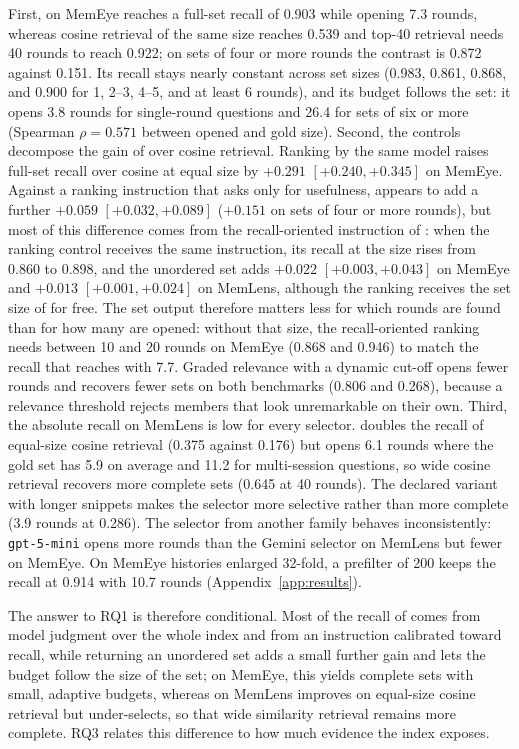 First, on MemEye \qss{} reaches a full-set recall of 0.903 while opening 7.3 rounds, whereas cosine retrieval of the same size reaches 0.539 and top-40 retrieval needs 40 rounds to reach 0.922; on sets of four or more rounds the contrast is 0.872 against 0.151. Its recall stays nearly constant across set sizes (0.983, 0.861, 0.868, and 0.900 for 1, 2--3, 4--5, and at least 6 rounds), and its budget follows the set: it opens 3.8 rounds for single-round questions and 26.4 for sets of six or more (Spearman $\rho{=}0.571$ between opened and gold size). Second, the controls decompose the gain of \qss{} over cosine retrieval. Ranking by the same model raises full-set recall over cosine at equal size by $+0.291$ $[+0.240, +0.345]$ on MemEye. Against a ranking instruction that asks only for usefulness, \qss{} appears to add a further $+0.059$ $[+0.032, +0.089]$ ($+0.151$ on sets of four or more rounds), but most of this difference comes from the recall-oriented instruction of \qss{}: when the ranking control receives the same instruction, its recall at the \qss{} size rises from 0.860 to 0.898, and the unordered set adds $+0.022$ $[+0.003, +0.043]$ on MemEye and $+0.013$ $[+0.001, +0.024]$ on MemLens, although the ranking receives the set size of \qss{} for free. The set output therefore matters less for which rounds are found than for how many are opened: without that size, the recall-oriented ranking needs between 10 and 20 rounds on MemEye (0.868 and 0.946) to match the recall that \qss{} reaches with 7.7. Graded relevance with a dynamic cut-off opens fewer rounds and recovers fewer sets on both benchmarks (0.806 and 0.268), because a relevance threshold rejects members that look unremarkable on their own. Third, the absolute recall on MemLens is low for every selector. \qss{} doubles the recall of equal-size cosine retrieval (0.375 against 0.176) but opens 6.1 rounds where the gold set has 5.9 on average and 11.2 for multi-session questions, so wide cosine retrieval recovers more complete sets (0.645 at 40 rounds). The declared variant with longer snippets makes the selector more selective rather than more complete (3.9 rounds at 0.286). The selector from another family behaves inconsistently: \texttt{gpt-5-mini} opens more rounds than the Gemini selector on MemLens but fewer on MemEye. On MemEye histories enlarged 32-fold, a prefilter of 200 keeps the recall at 0.914 with 10.7 rounds (Appendix~\ref{app:results}).

The answer to RQ1 is therefore conditional. Most of the recall of \qss{} comes from model judgment over the whole index and from an instruction calibrated toward recall, while returning an unordered set adds a small further gain and lets the budget follow the size of the set; on MemEye, this yields complete sets with small, adaptive budgets, whereas on MemLens \qss{} improves on equal-size cosine retrieval but under-selects, so that wide similarity retrieval remains more complete. RQ3 relates this difference to how much evidence the index exposes.

